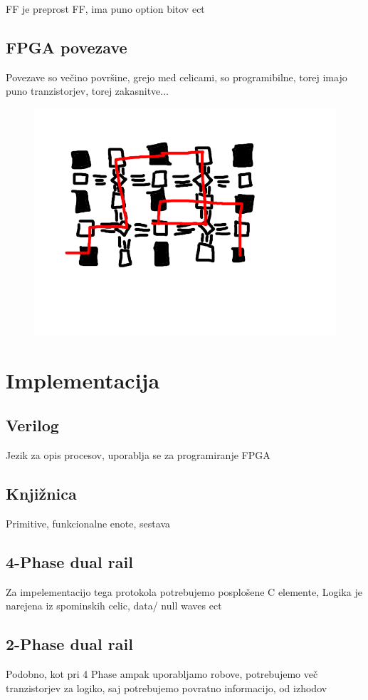 FF je preprost FF, ima puno option bitov ect

\subsection{FPGA povezave}

Povezave so večino površine, grejo med celicami, so programibilne, torej imajo puno tranzistorjev, torej zakasnitve...

\begin{figure}
	\centering
	\includegraphics[width=0.7\linewidth]{slike/routing}
	\caption{}
	\label{fig:cell}
\end{figure}

\section{Implementacija} \label{a}

\subsection{Verilog} \label{b}
Jezik za opis procesov, uporablja se za programiranje FPGA

\subsection{Knjižnica} \label{b}
Primitive, funkcionalne enote, sestava


\subsection{4-Phase dual rail} \label{b}
Za impelementacijo tega protokola potrebujemo posplošene C elemente, Logika je narejena iz spominskih celic, data/ null waves ect

\subsection{2-Phase dual rail} \label{b}
Podobno, kot pri 4 Phase ampak uporabljamo robove, potrebujemo več tranzistorjev za logiko, saj potrebujemo povratno informacijo, od izhodov


